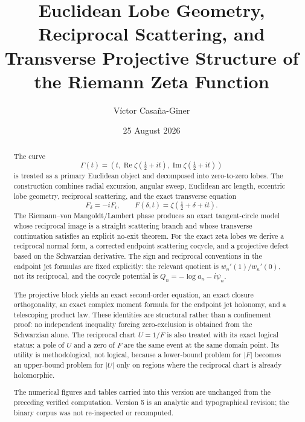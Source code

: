 \documentclass[11pt]{amsart}
\title[Euclidean lobe geometry of the zeta function]{Euclidean Lobe Geometry, Reciprocal Scattering, and Transverse Projective Structure of the Riemann Zeta Function}
\author{Víctor Casaña-Giner}
\date{25 August 2026}
\numberwithin{equation}{section}
\theoremstyle{definition}
\theoremstyle{remark}
\newcommand{\Ree}{\operatorname{Re}}
\newcommand{\Imm}{\operatorname{Im}}
\begin{document}
\begin{abstract}
The curve
\begin{equation}
\Gamma(t)=\left(t,\Ree\zeta\!\left(\tfrac12+it\right),\Imm\zeta\!\left(\tfrac12+it\right)\right)
\label{eq:abstract-thread}
\end{equation}
is treated as a primary Euclidean object and decomposed into zero-to-zero lobes.  The construction combines radial excursion, angular sweep, Euclidean arc length, eccentric lobe geometry, reciprocal scattering, and the exact transverse equation
\begin{equation}
F_\delta=-iF_t,
\qquad
F(\delta,t)=\zeta\!\left(\tfrac12+\delta+it\right).
\label{eq:abstract-quarter-turn}
\end{equation}
The Riemann--von Mangoldt/Lambert phase produces an exact tangent-circle model whose reciprocal image is a straight scattering branch and whose transverse continuation satisfies an explicit no-exit theorem.  For the exact zeta lobes we derive a reciprocal normal form, a corrected endpoint scattering cocycle, and a projective defect based on the Schwarzian derivative.  The sign and reciprocal conventions in the endpoint jet formulas are fixed explicitly: the relevant quotient is $w_n'(1)/w_n'(0)$, not its reciprocal, and the cocycle potential is $Q_n=-\log a_n-i\psi_n$.

The projective block yields an exact second-order equation, an exact closure orthogonality, an exact complex moment formula for the endpoint jet holonomy, and a telescoping product law.  These identities are structural rather than a confinement proof: no independent inequality forcing zero-exclusion is obtained from the Schwarzian alone.  The reciprocal chart $U=1/F$ is also treated with its exact logical status: a pole of $U$ and a zero of $F$ are the same event at the same domain point.  Its utility is methodological, not logical, because a lower-bound problem for $|F|$ becomes an upper-bound problem for $|U|$ only on regions where the reciprocal chart is already holomorphic.

The numerical figures and tables carried into this version are unchanged from the preceding verified computation.  Version 5 is an analytic and typographical revision; the binary corpus was not re-inspected or recomputed.
\end{abstract}

\maketitle
\tableofcontents
\end{document}
